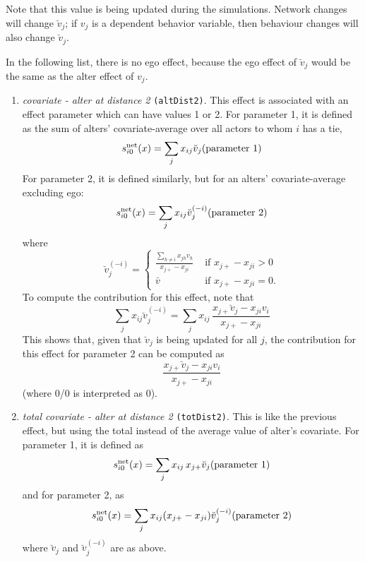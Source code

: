 \documentclass[a4paper,fleqn,11pt]{article}
\newcommand{\+}{\, + \,}
\newcommand{\vit}{\theenumi}
\newcounter{savenumi}
\begin{document}
Note that this value is being updated during the simulations.
Network changes will change $\breve v_j$; if $v_j$ is a dependent behavior
variable, then behaviour changes will also change $\breve v_j$.

In the following list, there is no ego effect, because the ego effect
of $\breve v_j$ would be the same as the alter effect of $v_j$.

\begin{enumerate}
\setcounter{enumi}{\value{savenumi}}

\item \emph{covariate - alter at distance 2} \texttt{(altDist2)}.
      This effect is associated with an effect parameter
      which can have values 1 or 2.
      For parameter 1, it is
      defined as the sum of alters' covariate-average over all actors
      to whom $i$ has a tie,
\[
 s^{\rm net}_{i\vit}(x) = \sum_j x_{ij} \breve v_j \hfill
            (\text{parameter 1}) \hfill
\]
      For parameter 2, it is defined similarly,
      but for an alters' covariate-average excluding
      ego:
\[
 s^{\rm net}_{i\vit}(x) = \sum_j x_{ij} \breve v_j^{(-i)} \hfill
                          (\text{parameter 2}) \hfill
\]
      where
\begin{equation}
  \breve v_j^{(-i)} = \left\{\begin{array}{ll} \displaystyle
         \frac{\sum_{h \neq i} x_{jh}v_h}{x_{j+} - x_{ji}}  &
                                       \text{ if } x_{j+} - x_{ji} > 0     \\
         \bar v                               &  \text{ if } x_{j+}- x_{ji} = 0  .
  \end{array}   \right.            \label{alt_av2}
\end{equation}
      To compute the contribution for this effect, note that
\[
 \sum_j x_{ij} \breve v_j^{(-i)} = \sum_j x_{ij} \,
                      \frac{x_{j+} \breve v_j - x_{ji}v_i}{x_{j+}-x_{ji}}
\]
      This shows that, given that $\breve v_j$ is being updated for all $j$,
      the contribution for this effect for parameter 2 can be computed as
      \[
       \frac{x_{j+} \breve v_j - x_{ji}v_i}{x_{j+}-x_{ji}}
      \]
      (where 0/0 is interpreted as 0).


\item \emph{total covariate - alter at distance 2} \texttt{(totDist2)}.
      This is like the previous effect, but using the total
      instead of the average value of alter's covariate.
      For parameter 1, it is  defined as
\[
 s^{\rm net}_{i\vit}(x) = \sum_j x_{ij} \, x_{j+}\breve v_j \hfill
            (\text{parameter 1}) \hfill
\]
      and for parameter 2, as
\[
 s^{\rm net}_{i\vit}(x) = \sum_j x_{ij} (x_{j+} - x_{ji}) \breve v_j^{(-i)} \hfill
                          (\text{parameter 2}) \hfill
\]
      where $\breve v_j$ and $\breve v_j^{(-i)}$ are as above.


\end{enumerate}
\end{document}

